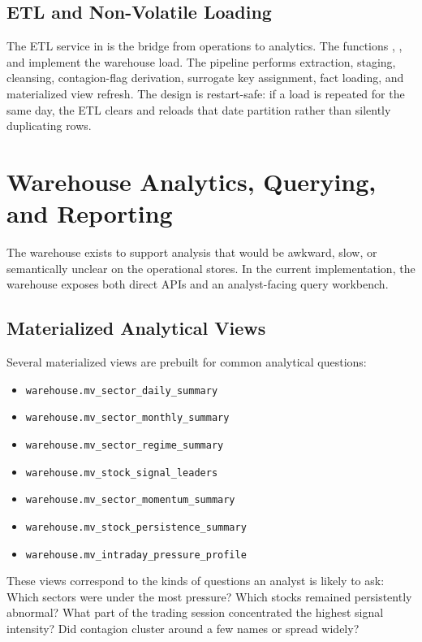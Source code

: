 \documentclass[11pt,a4paper]{article}
\begin{document}
\subsection{ETL and Non-Volatile Loading}
The ETL service in  is the bridge from operations to analytics. The functions , , and  implement the warehouse load. The pipeline performs extraction, staging, cleansing, contagion-flag derivation, surrogate key assignment, fact loading, and materialized view refresh. The design is restart-safe: if a load is repeated for the same day, the ETL clears and reloads that date partition rather than silently duplicating rows.

\section{Warehouse Analytics, Querying, and Reporting}
The warehouse exists to support analysis that would be awkward, slow, or semantically unclear on the operational stores. In the current implementation, the warehouse exposes both direct APIs and an analyst-facing query workbench.

\subsection{Materialized Analytical Views}
Several materialized views are prebuilt for common analytical questions:
\begin{itemize}
    \item \texttt{warehouse.mv\_sector\_daily\_summary}
    \item \texttt{warehouse.mv\_sector\_monthly\_summary}
    \item \texttt{warehouse.mv\_sector\_regime\_summary}
    \item \texttt{warehouse.mv\_stock\_signal\_leaders}
    \item \texttt{warehouse.mv\_sector\_momentum\_summary}
    \item \texttt{warehouse.mv\_stock\_persistence\_summary}
    \item \texttt{warehouse.mv\_intraday\_pressure\_profile}
\end{itemize}

These views correspond to the kinds of questions an analyst is likely to ask: Which sectors were under the most pressure? Which stocks remained persistently abnormal? What part of the trading session concentrated the highest signal intensity? Did contagion cluster around a few names or spread widely?
\end{document}
